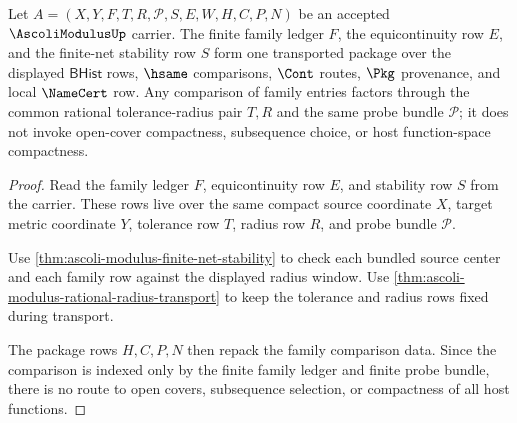\begin{theorem}
\label{thm:ascoli-modulus-family-transport-package}
Let $A=(X,Y,F,T,R,\mathcal{P},S,E,W,H,C,P,N)$ be an accepted $\AscoliModulusUp$ carrier. The finite family ledger $F$, the equicontinuity row $E$, and the finite-net stability row $S$ form one transported package over the displayed $\mathsf{BHist}$ rows, $\hsame$ comparisons, $\Cont$ routes, $\Pkg$ provenance, and local $\NameCert$ row. Any comparison of family entries factors through the common rational tolerance-radius pair $T,R$ and the same probe bundle $\mathcal{P}$; it does not invoke open-cover compactness, subsequence choice, or host function-space compactness.
\end{theorem}
\begin{proof}
Read the family ledger $F$, equicontinuity row $E$, and stability row $S$ from the carrier. These rows live over the same compact source coordinate $X$, target metric coordinate $Y$, tolerance row $T$, radius row $R$, and probe bundle $\mathcal{P}$.

Use \autoref{thm:ascoli-modulus-finite-net-stability} to check each bundled source center and each family row against the displayed radius window. Use \autoref{thm:ascoli-modulus-rational-radius-transport} to keep the tolerance and radius rows fixed during transport.

The package rows $H,C,P,N$ then repack the family comparison data. Since the comparison is indexed only by the finite family ledger and finite probe bundle, there is no route to open covers, subsequence selection, or compactness of all host functions.
\end{proof}


